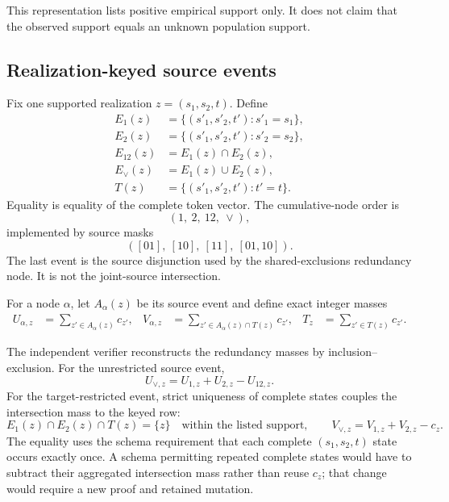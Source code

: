 \documentclass[11pt]{article}
\theoremstyle{definition}
\begin{document}
This representation lists positive empirical support only.  It does not claim that the observed
support equals an unknown population support.

\subsection{Realization-keyed source events}

Fix one supported realization $z=(s_1,s_2,t)$.  Define
\begin{align}
  E_1(z)&=\{(s'_1,s'_2,t') : s'_1=s_1\},\\
  E_2(z)&=\{(s'_1,s'_2,t') : s'_2=s_2\},\\
  E_{12}(z)&=E_1(z)\cap E_2(z),\\
  E_{\vee}(z)&=E_1(z)\cup E_2(z),\\
  T(z)&=\{(s'_1,s'_2,t') : t'=t\}.
\end{align}
Equality is equality of the complete token vector.  The cumulative-node order is
\begin{equation}
  (1,\ 2,\ 12,\ \vee),
\end{equation}
implemented by source masks
\begin{equation}
  ([01],\ [10],\ [11],\ [01,10]).
\end{equation}
The last event is the source disjunction used by the shared-exclusions redundancy node.  It is not
the joint-source intersection.

For a node $\alpha$, let $A_\alpha(z)$ be its source event and define exact integer masses
\begin{align}
  U_{\alpha,z}
    &=\sum_{z'\in A_\alpha(z)}c_{z'},&
  V_{\alpha,z}
    &=\sum_{z'\in A_\alpha(z)\cap T(z)}c_{z'},&
  T_z
    &=\sum_{z'\in T(z)}c_{z'}.
\end{align}

The independent verifier reconstructs the redundancy masses by inclusion--exclusion.  For the
unrestricted source event,
\begin{equation}
  U_{\vee,z}=U_{1,z}+U_{2,z}-U_{12,z}.
\end{equation}
For the target-restricted event, strict uniqueness of complete states couples the intersection
mass to the keyed row:
\begin{equation}
  E_1(z)\cap E_2(z)\cap T(z)=\{z\}
  \quad\text{within the listed support},\qquad
  V_{\vee,z}=V_{1,z}+V_{2,z}-c_z.
  \label{eq:target-union-inclusion-exclusion}
\end{equation}
The equality uses the schema requirement that each complete \((s_1,s_2,t)\) state occurs exactly
once.  A schema permitting repeated complete states would have to subtract their aggregated
intersection mass rather than reuse \(c_z\); that change would require a new proof and retained
mutation.
\end{document}
